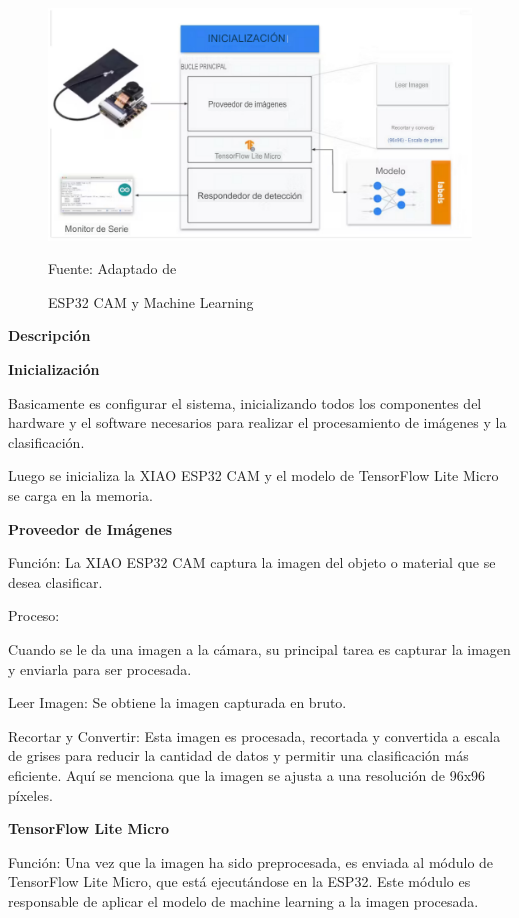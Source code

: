 \begin{figure}[H]
	\centering
	\includegraphics[scale  = 0.50]{Imagenes/ESP32-XIAO-CNN.jpg}
	\caption{ESP32 CAM y Machine Learning}{Fuente: Adaptado de~\cite{art_Xiao}}

\end{figure}

\textbf{Descripción}

\textbf{Inicialización}

Basicamente es configurar el sistema, inicializando todos los componentes del hardware y el software necesarios para realizar el procesamiento de imágenes y la clasificación.

Luego se inicializa la XIAO ESP32 CAM y el modelo de TensorFlow Lite Micro se carga en la memoria.

\textbf{Proveedor de Imágenes}

Función: La XIAO ESP32 CAM captura la imagen del objeto o material que se desea clasificar.

Proceso:

Cuando se le da una imagen a la cámara, su principal tarea es capturar la imagen y enviarla para ser procesada.

Leer Imagen: Se obtiene la imagen capturada en bruto.

Recortar y Convertir: Esta imagen es procesada, recortada y convertida a escala de grises para reducir la cantidad de datos y permitir una clasificación más eficiente. Aquí se menciona que la imagen se ajusta a una resolución de 96x96 píxeles.

\textbf{TensorFlow Lite Micro}

Función: Una vez que la imagen ha sido preprocesada, es enviada al módulo de TensorFlow Lite Micro, que está ejecutándose en la ESP32. Este módulo es responsable de aplicar el modelo de machine learning a la imagen procesada.

